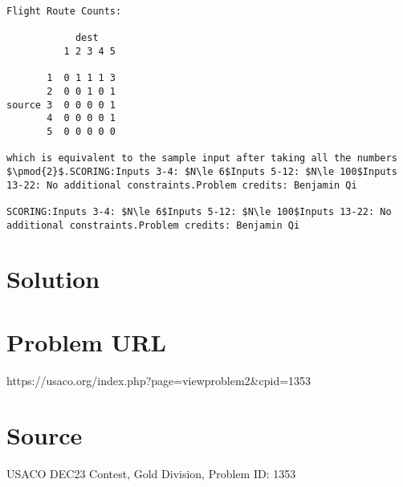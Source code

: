 \documentclass[12pt]{article}
\begin{document}
\begin{verbatim}
Flight Route Counts:

            dest
          1 2 3 4 5

       1  0 1 1 1 3 
       2  0 0 1 0 1 
source 3  0 0 0 0 1 
       4  0 0 0 0 1 
       5  0 0 0 0 0

which is equivalent to the sample input after taking all the numbers $\pmod{2}$.SCORING:Inputs 3-4: $N\le 6$Inputs 5-12: $N\le 100$Inputs 13-22: No additional constraints.Problem credits: Benjamin Qi

SCORING:Inputs 3-4: $N\le 6$Inputs 5-12: $N\le 100$Inputs 13-22: No additional constraints.Problem credits: Benjamin Qi
\end{verbatim}

\section*{Solution}


\section*{Problem URL}
https://usaco.org/index.php?page=viewproblem2&cpid=1353

\section*{Source}
USACO DEC23 Contest, Gold Division, Problem ID: 1353
\end{document}
